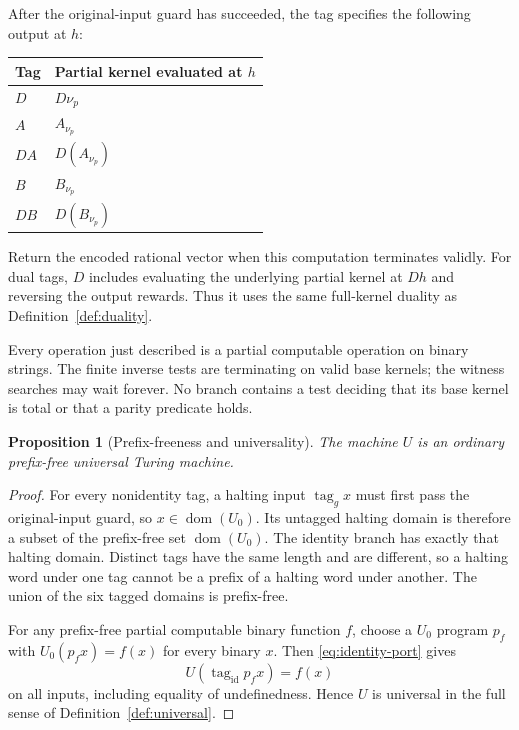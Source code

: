 \documentclass[11pt]{article}
\newtheorem{proposition}[theorem]{Proposition}
\theoremstyle{definition}
\theoremstyle{remark}
\newcommand{\dom}{\operatorname{dom}}
\newcommand{\id}{\mathrm{id}}
\newcommand{\tagword}{\operatorname{tag}}
\begin{document}
After the original-input guard has succeeded, the tag specifies the
following output at $h$:
\begin{center}
\begin{tabular}{ll}
\toprule
Tag & Partial kernel evaluated at $h$\\
\midrule
$D$  & $D\nu_p$\\
$A$  & $A_{\nu_p}$\\
$DA$ & $D(A_{\nu_p})$\\
$B$  & $B_{\nu_p}$\\
$DB$ & $D(B_{\nu_p})$\\
\bottomrule
\end{tabular}
\end{center}
Return the encoded rational vector when this computation terminates
validly.  For dual tags, $D$ includes evaluating the underlying partial
kernel at $Dh$ and reversing the output rewards.  Thus it uses the
same full-kernel duality as Definition~\ref{def:duality}.

Every operation just described is a partial computable operation on
binary strings.  The finite inverse tests are terminating on valid
base kernels; the witness searches may wait forever.  No branch
contains a test deciding that its base kernel is total or that a
parity predicate holds.

\begin{proposition}[Prefix-freeness and universality]
\label{prop:universal-machine}
The machine $U$ is an ordinary prefix-free universal Turing machine.
\end{proposition}

\begin{proof}
For every nonidentity tag, a halting input $\tagword_gx$ must first
pass the original-input guard, so $x\in\dom(U_0)$.  Its untagged
halting domain is therefore a subset of the prefix-free set
$\dom(U_0)$.  The identity branch has exactly that halting domain.
Distinct tags have the same length and are different, so a halting
word under one tag cannot be a prefix of a halting word under
another.  The union of the six tagged domains is prefix-free.

For any prefix-free partial computable binary function $f$, choose
a $U_0$ program $p_f$ with $U_0(p_fx)=f(x)$ for every binary $x$.
Then \eqref{eq:identity-port} gives
\[
  U(\tagword_{\id}p_fx)=f(x)
\]
on all inputs, including equality of undefinedness.  Hence $U$ is
universal in the full sense of Definition~\ref{def:universal}.
\end{proof}
\end{document}
